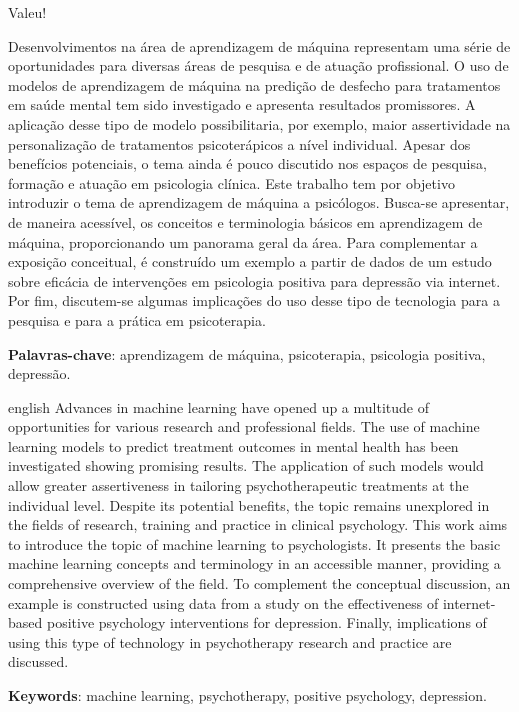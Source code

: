 \documentclass[
	12pt,				        %
	openany,			        %
	oneside,			        %
	a4paper,			        %
	english,			        %
	brazil				        %
	]{abntex2}
\begin{document}
\begin{agradecimentos}
Valeu!
\end{agradecimentos}


\setlength{\absparsep}{18pt} %
\begin{resumo}
Desenvolvimentos na área de aprendizagem de máquina representam uma série de oportunidades para diversas áreas de pesquisa e de atuação profissional.
O uso de modelos de aprendizagem de máquina na predição de desfecho para tratamentos em saúde mental tem sido investigado e apresenta resultados promissores.
A aplicação desse tipo de modelo possibilitaria, por exemplo, maior assertividade na personalização de tratamentos psicoterápicos a nível individual.
Apesar dos benefícios potenciais, o tema ainda é pouco discutido nos espaços de pesquisa, formação e atuação em psicologia clínica. Este trabalho tem
por objetivo introduzir o tema de aprendizagem de máquina a psicólogos. Busca-se apresentar, de maneira acessível, os conceitos e terminologia básicos
em aprendizagem de máquina, proporcionando um panorama geral da área. Para complementar a exposição conceitual, é construído um exemplo a partir de dados
de um estudo sobre eficácia de intervenções em psicologia positiva para depressão via internet. Por fim, discutem-se algumas implicações do uso desse tipo
de tecnologia para a pesquisa e para a prática em psicoterapia.

 \textbf{Palavras-chave}: aprendizagem de máquina, psicoterapia, psicologia positiva, depressão.
\end{resumo}

\begin{resumo}[Abstract]
 \begin{otherlanguage*}{english}
   Advances in machine learning have opened up a multitude of opportunities for various research and professional fields. The use of machine learning models to
   predict treatment outcomes in mental health has been investigated showing promising results. The application of such models would allow greater assertiveness
   in tailoring psychotherapeutic treatments at the individual level. Despite its potential benefits, the topic remains unexplored in the fields of research, training
   and practice in clinical psychology. This work aims to introduce the topic of machine learning to psychologists. It presents the basic machine learning concepts and
   terminology in an accessible manner, providing a comprehensive overview of the field. To complement the conceptual discussion, an example is constructed using data
   from a study on the effectiveness of internet-based positive psychology interventions for depression. Finally, implications of using this type of technology in
   psychotherapy research and practice are discussed.
   \vspace{\onelineskip}
 
   \noindent 
   \textbf{Keywords}: machine learning, psychotherapy, positive psychology, depression.
 \end{otherlanguage*}
\end{resumo}
\end{document}
